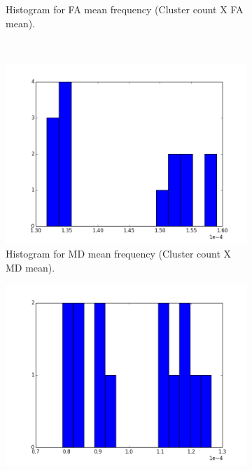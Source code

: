 \documentclass[a4paper,11pt]{report}
\begin{document}
\begin{figure}[!ht]
\begin{subfigure}[t]{.49\textwidth}
        \caption{Histogram for FA mean frequency (Cluster count X FA mean).}
        \label{subfig:fa_hist_fa}
      \end{subfigure}\hfill\\
      \begin{subfigure}[t]{.49\textwidth}
        \includegraphics[width=1\linewidth]{img/histograms/tc_clustered_fa_mask_md_means_hist.png}
        \caption{Histogram for MD mean frequency (Cluster count X MD mean).}
        \label{subfig:fa_hist_md}
      \end{subfigure}\hfill%
      \begin{subfigure}[t]{.49\textwidth}
        \includegraphics[width=1\linewidth]{img/histograms/tc_clustered_fa_mask_rd_means_hist.png}

\end{subfigure}
\end{figure}
\end{document}

